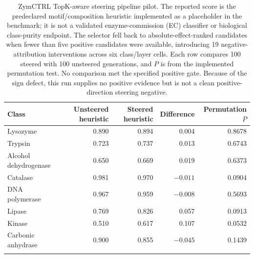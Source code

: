 \documentclass[pdflatex,sn-nature]{sn-jnl}
\begin{document}
\clearpage

\begin{table}[p!]
\caption{ZymCTRL TopK-aware steering pipeline pilot. The reported score is the predeclared motif/composition heuristic implemented as a placeholder in the benchmark; it is not a validated enzyme-commission (EC) classifier or biological class-purity endpoint. The selector fell back to absolute-effect-ranked candidates when fewer than five positive candidates were available, introducing 19 negative-attribution interventions across six class/layer cells. Each row compares 100 steered with 100 unsteered generations, and $P$ is from the implemented permutation test. No comparison met the specified positive gate. Because of the sign defect, this run supplies no positive evidence but is not a clean positive-direction steering negative.}
\label{tab:supp-steering}
\scriptsize
\setlength{\tabcolsep}{3pt}
\begin{tabular}{@{}lrrrr@{}}
\toprule
Class & Unsteered heuristic & Steered heuristic & Difference & Permutation $P$ \\
\midrule
Lysozyme & 0.890 & 0.894 & 0.004 & 0.8678 \\
Trypsin & 0.723 & 0.737 & 0.013 & 0.6743 \\
Alcohol dehydrogenase & 0.650 & 0.669 & 0.019 & 0.6373 \\
Catalase & 0.981 & 0.970 & $-0.011$ & 0.0904 \\
DNA polymerase & 0.967 & 0.959 & $-0.008$ & 0.5693 \\
Lipase & 0.769 & 0.826 & 0.057 & 0.0913 \\
Kinase & 0.510 & 0.617 & 0.107 & 0.0532 \\
Carbonic anhydrase & 0.900 & 0.855 & $-0.045$ & 0.1439 \\
\botrule
\end{tabular}
\end{table}

\clearpage
\end{document}
